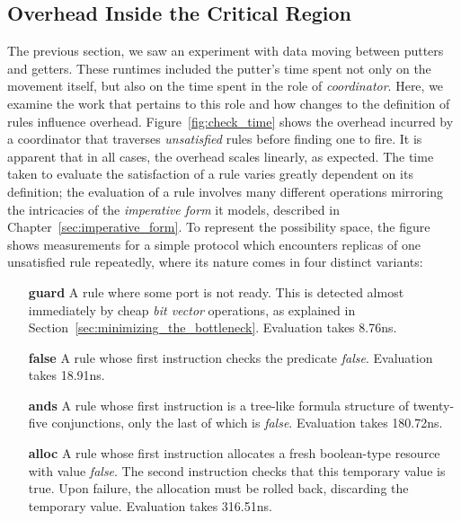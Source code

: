 \subsection{Overhead Inside the Critical Region}
The previous section, we saw an experiment with data moving between putters and getters. These runtimes included the putter's time spent not only on the movement itself, but also on the time spent in the role of \textit{coordinator}. Here, we examine the work that pertains to this role and how changes to the definition of rules influence overhead. Figure~\ref{fig:check_time} shows the overhead incurred by a coordinator that traverses \textit{unsatisfied} rules before finding one to fire. It is apparent that in all cases, the overhead scales linearly, as expected. The time taken to evaluate the satisfaction of a rule varies greatly dependent on its definition; the evaluation of a rule involves many different operations mirroring the intricacies of the \textit{imperative form} it models, described in Chapter~\ref{sec:imperative_form}. To represent the possibility space, the figure shows measurements for a simple protocol which encounters replicas of one unsatisfied rule repeatedly, where its nature comes in four distinct variants:
\begin{enumerate}
	\item [\textbf{guard}] A rule where some port is not ready. This is detected almost immediately by cheap \textit{bit vector} operations, as explained in Section~\ref{sec:minimizing_the_bottleneck}. Evaluation takes 8.76ns.
	
	\item [\textbf{false}] A rule whose first instruction checks the predicate \textit{false}. Evaluation takes 18.91ns.
	\item [\textbf{ands}] A rule whose first instruction is a tree-like formula structure of twenty-five conjunctions, only the last of which is \textit{false}. Evaluation takes 180.72ns.
	\item [\textbf{alloc}] A rule whose first instruction allocates a fresh boolean-type resource with value \textit{false}. The second instruction checks that this temporary value is true. Upon failure, the allocation must be rolled back, discarding the temporary value. Evaluation takes 316.51ns.
\end{enumerate}



